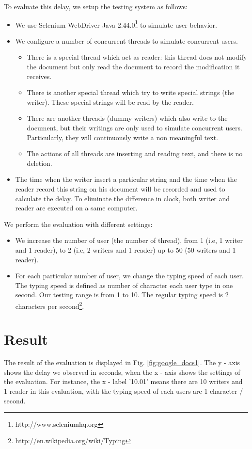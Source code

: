 \documentclass[a4paper,12pt]{article}
\begin{document}
To evaluate this delay, we setup the testing system as follows:
\begin{itemize}
	\item We use Selenium WebDriver Java 2.44.0\footnote{http://www.seleniumhq.org} to simulate user behavior.
	\item We configure a number of concurrent threads to simulate concurrent users.
	\begin{itemize}
		\item There is a special thread which act as reader: this thread does not modify the document but only read the document to record the modification it receives.
		\item There is another special thread which try to write special strings (the writer). These special strings will be read by the reader.
		\item There are another threads (dummy writers) which also write to the document, but their writings are only used to simulate concurrent users. Particularly, they will continuously write a non meaningful text.
		\item The actions of all threads are inserting and reading text, and there is no deletion.
	\end{itemize}
	\item The time when the writer insert a particular string and the time when the reader record this string on his document will be recorded and used to calculate the delay. To eliminate the difference in clock, both writer and reader are executed on a same computer.
\end{itemize}
We perform the evaluation with different settings:
\begin{itemize}
	\item We increase the number of user (the number of thread), from 1 (i.e, 1 writer and 1 reader), to 2 (i.e, 2 writers and 1 reader) up to 50 (50 writers and 1 reader).
	\item For each particular number of user, we change the typing speed of each user. The typing speed is defined as number of character each user type in one second. Our testing range is from 1 to 10. The regular typing speed is 2 characters per second\footnote{http://en.wikipedia.org/wiki/Typing}.
\end{itemize}

\section{Result}

The result of the evaluation is displayed in Fig. \ref{fig:google_docs1}. The y - axis shows the delay we observed in seconds, when the x - axis shows the settings of the evaluation. For instance, the x - label '10.01' means there are 10 writers and 1 reader in this evaluation, with the typing speed of each users are 1 character / second. 
\end{document}
